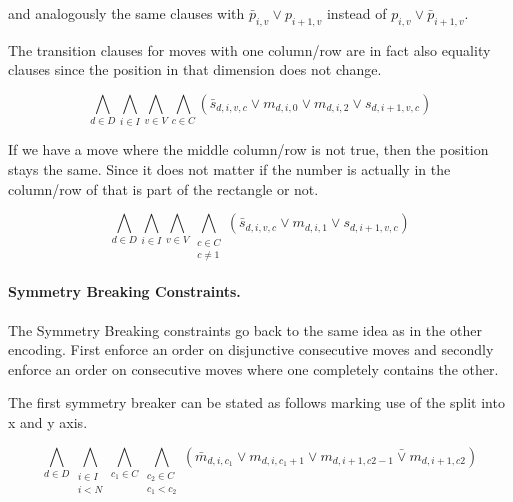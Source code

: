 \documentclass[]{llncs}
\begin{document}
and analogously the same clauses with $\bar p_{i,v} \vee p_{i+1,v}$ instead of $ p_{i,v} \vee \bar p_{i+1,v}$.

The transition clauses for moves with one column/row are in fact also equality clauses since the position in that
dimension does not change. 

\begin{equation}
\bigwedge_{d \in D} \bigwedge_{i\in I} \bigwedge_{v\in V}  \bigwedge_{c\in C}  (\bar s_{d,i,v,c} \vee m_{d,i,0} \vee
m_{d,i,2}   \vee s_{d,i+1,v,c}) 
\end{equation}

If we have a move where the middle column/row is not true, then the position stays the same. Since it does not matter if
the number is actually in the column/row of that is part of the rectangle or not. 

\begin{equation}
\bigwedge_{d \in D} \bigwedge_{i\in I} \bigwedge_{v\in V}  \bigwedge_{\substack{c\in C \\ c \neq 1}} (\bar s_{d,i,v,c}
\vee m_{d,i,1} \vee s_{d,i+1,v,c})
\end{equation}

\paragraph{Symmetry Breaking Constraints.}
%
%
The Symmetry Breaking constraints go back to the same idea as in the other encoding. First enforce an order on
disjunctive consecutive moves and secondly enforce an order on consecutive moves where one completely contains the other.

The first symmetry breaker can be stated as follows marking use of the split into x and y axis. 

\begin{equation}
\bigwedge_{d\in D} \bigwedge_{\substack{i\in I \\ i < N }} \bigwedge_{c_1\in C} \bigwedge_{\substack{c_2\in C \\ c_1 <
c_2 }} (\bar m_{d,i,c_1} \vee m_{d,i,c_1 + 1} \vee m_{d,i+1,c2-1} \bar \vee m_{d,i+1,c2})
\end{equation}
\end{document}
